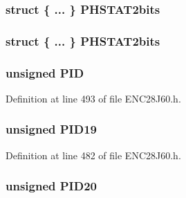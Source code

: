 \subsubsection[{P\+H\+S\+T\+A\+T2bits}]{\setlength{\rightskip}{0pt plus 5cm}struct \{ ... \}   P\+H\+S\+T\+A\+T2bits}\label{union_p_h_y_r_e_g_af762b6e72f0423f4b5865d8ecb744475}
\hypertarget{union_p_h_y_r_e_g_acf181c327177636d11e5091047b61dce}{}
\subsubsection[{P\+H\+S\+T\+A\+T2bits}]{\setlength{\rightskip}{0pt plus 5cm}struct \{ ... \}   P\+H\+S\+T\+A\+T2bits}\label{union_p_h_y_r_e_g_acf181c327177636d11e5091047b61dce}
\hypertarget{union_p_h_y_r_e_g_a97b41b25e06fd7857dcc6217c160a8ad}{}
\subsubsection[{P\+I\+D}]{\setlength{\rightskip}{0pt plus 5cm}unsigned P\+I\+D}\label{union_p_h_y_r_e_g_a97b41b25e06fd7857dcc6217c160a8ad}


Definition at line 493 of file E\+N\+C28\+J60.\+h.

\hypertarget{union_p_h_y_r_e_g_a0a4c48ae1a7c6e6a511aa2996afc9a83}{}
\subsubsection[{P\+I\+D19}]{\setlength{\rightskip}{0pt plus 5cm}unsigned P\+I\+D19}\label{union_p_h_y_r_e_g_a0a4c48ae1a7c6e6a511aa2996afc9a83}


Definition at line 482 of file E\+N\+C28\+J60.\+h.

\hypertarget{union_p_h_y_r_e_g_a001459a95f2fc3774088eabc91beb247}{}
\subsubsection[{P\+I\+D20}]{\setlength{\rightskip}{0pt plus 5cm}unsigned P\+I\+D20}\label{union_p_h_y_r_e_g_a001459a95f2fc3774088eabc91beb247}


